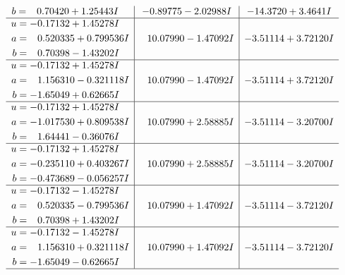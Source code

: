\documentclass[1p]{elsarticle_modified}
\theoremstyle{definition}
\begin{document}
$$\begin{array}{c|c|c}
\begin{aligned}
b &= \phantom{-}0.70420 + 1.25443 I\end{aligned}
 & -0.89775 - 2.02988 I & -14.3720 + 3.4641 I \\ \hline\begin{aligned}
u &= -0.17132 + 1.45278 I \\
a &= \phantom{-}0.520335 + 0.799536 I \\
b &= \phantom{-}0.70398 - 1.43202 I\end{aligned}
 & \phantom{-}10.07990 - 1.47092 I & -3.51114 + 3.72120 I \\ \hline\begin{aligned}
u &= -0.17132 + 1.45278 I \\
a &= \phantom{-}1.156310 - 0.321118 I \\
b &= -1.65049 + 0.62665 I\end{aligned}
 & \phantom{-}10.07990 - 1.47092 I & -3.51114 + 3.72120 I \\ \hline\begin{aligned}
u &= -0.17132 + 1.45278 I \\
a &= -1.017530 + 0.809538 I \\
b &= \phantom{-}1.64441 - 0.36076 I\end{aligned}
 & \phantom{-}10.07990 + 2.58885 I & -3.51114 - 3.20700 I \\ \hline\begin{aligned}
u &= -0.17132 + 1.45278 I \\
a &= -0.235110 + 0.403267 I \\
b &= -0.473689 - 0.056257 I\end{aligned}
 & \phantom{-}10.07990 + 2.58885 I & -3.51114 - 3.20700 I \\ \hline\begin{aligned}
u &= -0.17132 - 1.45278 I \\
a &= \phantom{-}0.520335 - 0.799536 I \\
b &= \phantom{-}0.70398 + 1.43202 I\end{aligned}
 & \phantom{-}10.07990 + 1.47092 I & -3.51114 - 3.72120 I \\ \hline\begin{aligned}
u &= -0.17132 - 1.45278 I \\
a &= \phantom{-}1.156310 + 0.321118 I \\
b &= -1.65049 - 0.62665 I\end{aligned}
 & \phantom{-}10.07990 + 1.47092 I & -3.51114 - 3.72120 I\\
 \hline 
 \end{array}$$\newpage$$\begin{array}{c|c|c}  

\end{array}$$
\end{document}
